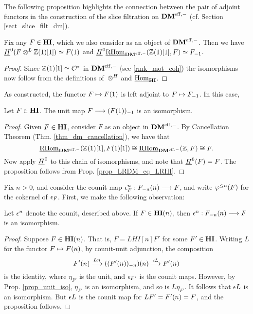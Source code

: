 The following proposition highlights the connection between the
pair of adjoint functors in the construction of the slice 
filtration on $\DMeff$ (cf.  Section \ref{sect_slice_filt_dm}).

\begin{prop}\label{prop_LRDM_eq_LRHI}
Fix any $F \in \HI$, which we also consider as an object of 
$\DMeff$. Then we have $\sheaf{H}^0(F \tDM \Z(1)[1]) \simeq 
\LHI{F}$ and $\sheaf{H}^0\ihomDMf(\Z(1)[1], F) \simeq \RHI{F}$.
\end{prop}
\begin{proof}
Since $\Z(1)[1] \simeq \Ox$ in $\DMeff$ (see \ref{rmk_mot_coh})
the isomorphisms now follow from the definitions of $\tHI$ and 
$\ihomHI$.
\end{proof}

As constructed, the functor $F \mapsto \LHI{F}$ is left adjoint to 
$F \mapsto \RHI{F}$. In this case,

\begin{prop}\label{prop_unit_iso}
Let $F \in \HI$. The unit map $F \to \RHI{(\LHI{F})}$ is an
isomorphism.
\end{prop}
\begin{proof}
Given $F \in \HI$, consider $F$ as an object in $\DMeff$. By
Cancellation Theorem (Thm. \ref{thm_dm_cancellation}), we have
that 
\[
\ihomDMf(\Z(1)[1], F(1)[1]) \cong \ihomDMf(\Z, F) 
\cong F. 
\]
Now apply $\sheaf{H}^0$ to this chain of isomorphisms, and note 
that $\sheaf{H}^0(F) = F$. The proposition follows from Prop. 
\ref{prop_LRDM_eq_LRHI}.
\end{proof}

Fix $n > 0$, and consider the counit map $\cuHI_F^n: 
\LHI[n]{\RHI[n]{F}} \to F$, and write $\tlHI{n}(F)$ for the 
cokernel of $\cuHI_F$. First, we make the following observation:

\begin{prop}\label{prop_counit_iso_for_HIn}
Let $\cuHI^n$ denote the counit, described above. If $F \in 
\LHI[n]{\HI}$, then $\cuHI^n : \LHI[n]{\RHI[n]{F}} \to F$ is
an isomorphism.
\end{prop}
\begin{proof}
Suppose $F \in \LHI[n]{\HI}$. That is, $F = LHI[n]{F'}$ for some 
$F' \in \HI$. Writing $L$ for the functor $F \mapsto \LHI[n]F$, 
by counit-unit adjunction, the composition
\[
\LHI[n]{F'} \xrightarrow{L\eta} \LHI[n]{(\RHI[n]{(\LHI[n]{F'})})}
   \xrightarrow{\cuHI L} \LHI[n]{F'}
\]
is the identity, where $\eta_{F'}$ is the unit, and $\cuHI_{F'}$ 
is the counit maps. However, by Prop. \ref{prop_unit_iso}, 
$\eta_{F'}$ is an isomorphism, and so is $L\eta_{F'}$. It follows
that $\cuHI L$ is an isomorphism. But $\cuHI L$ is the counit
map for $LF' = \LHI[n]{F'} = F$, and the proposition follows.
\end{proof}

